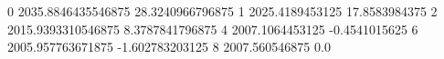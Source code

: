 0 2035.8846435546875 28.3240966796875
1 2025.4189453125 17.8583984375
2 2015.9393310546875 8.3787841796875
4 2007.1064453125 -0.4541015625
6 2005.957763671875 -1.602783203125
8 2007.560546875 0.0
